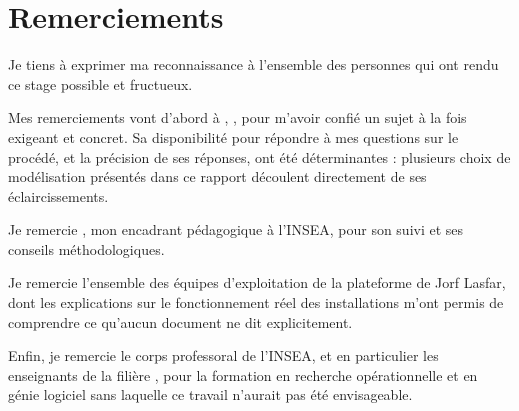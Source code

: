 \chapter*{Remerciements}


Je tiens à exprimer ma reconnaissance à l'ensemble des personnes qui ont rendu ce stage
possible et fructueux.

Mes remerciements vont d'abord à \encadrantEntreprise, \fonctionEncadrant, pour m'avoir
confié un sujet à la fois exigeant et concret. Sa disponibilité pour répondre à mes
questions sur le procédé, et la précision de ses réponses, ont été déterminantes : plusieurs
choix de modélisation présentés dans ce rapport découlent directement de ses éclaircissements.

Je remercie \encadrantEcole, mon encadrant pédagogique à l'INSEA, pour son suivi et ses
conseils méthodologiques.

Je remercie l'ensemble des équipes d'exploitation de la plateforme de Jorf Lasfar, dont les
explications sur le fonctionnement réel des installations m'ont permis de comprendre ce
qu'aucun document ne dit explicitement.

Enfin, je remercie le corps professoral de l'INSEA, et en particulier les enseignants de la
filière \filiere, pour la formation en recherche opérationnelle et en génie logiciel sans
laquelle ce travail n'aurait pas été envisageable.

\cleardoublepage
